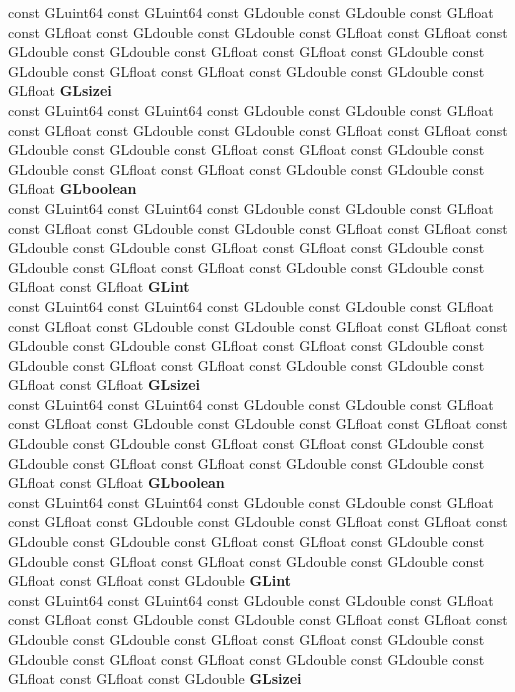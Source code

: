 \begin{DoxyCompactItemize}
\begin{tabbing}
\>const GLuint64 const GLuint64 const GLdouble const GLdouble const GLfloat const GLfloat const GLdouble const GLdouble const GLfloat const GLfloat const GLdouble const GLdouble const GLfloat const GLfloat const GLdouble const GLdouble const GLfloat const GLfloat const GLdouble const GLdouble const GLfloat {\bfseries GLsizei}\\
\>const GLuint64 const GLuint64 const GLdouble const GLdouble const GLfloat const GLfloat const GLdouble const GLdouble const GLfloat const GLfloat const GLdouble const GLdouble const GLfloat const GLfloat const GLdouble const GLdouble const GLfloat const GLfloat const GLdouble const GLdouble const GLfloat {\bfseries GLboolean}\\
\>const GLuint64 const GLuint64 const GLdouble const GLdouble const GLfloat const GLfloat const GLdouble const GLdouble const GLfloat const GLfloat const GLdouble const GLdouble const GLfloat const GLfloat const GLdouble const GLdouble const GLfloat const GLfloat const GLdouble const GLdouble const GLfloat const GLfloat {\bfseries GLint}\\
\>const GLuint64 const GLuint64 const GLdouble const GLdouble const GLfloat const GLfloat const GLdouble const GLdouble const GLfloat const GLfloat const GLdouble const GLdouble const GLfloat const GLfloat const GLdouble const GLdouble const GLfloat const GLfloat const GLdouble const GLdouble const GLfloat const GLfloat {\bfseries GLsizei}\\
\>const GLuint64 const GLuint64 const GLdouble const GLdouble const GLfloat const GLfloat const GLdouble const GLdouble const GLfloat const GLfloat const GLdouble const GLdouble const GLfloat const GLfloat const GLdouble const GLdouble const GLfloat const GLfloat const GLdouble const GLdouble const GLfloat const GLfloat {\bfseries GLboolean}\\
\>const GLuint64 const GLuint64 const GLdouble const GLdouble const GLfloat const GLfloat const GLdouble const GLdouble const GLfloat const GLfloat const GLdouble const GLdouble const GLfloat const GLfloat const GLdouble const GLdouble const GLfloat const GLfloat const GLdouble const GLdouble const GLfloat const GLfloat const GLdouble {\bfseries GLint}\\
\>const GLuint64 const GLuint64 const GLdouble const GLdouble const GLfloat const GLfloat const GLdouble const GLdouble const GLfloat const GLfloat const GLdouble const GLdouble const GLfloat const GLfloat const GLdouble const GLdouble const GLfloat const GLfloat const GLdouble const GLdouble const GLfloat const GLfloat const GLdouble {\bfseries GLsizei}\\

\end{tabbing}
\end{DoxyCompactItemize}
